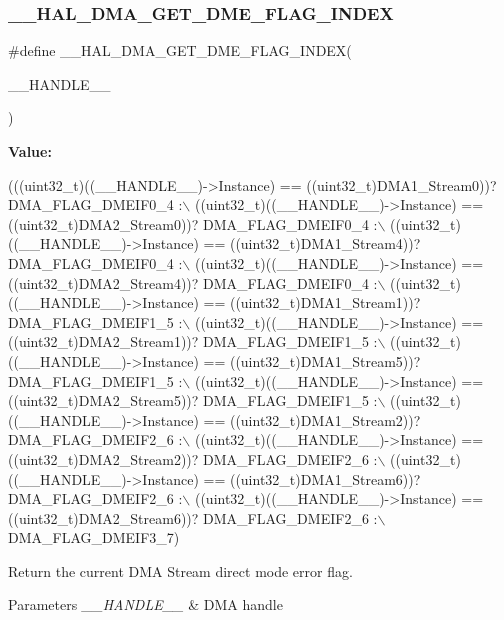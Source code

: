 \subsubsection{\texorpdfstring{\+\_\+\+\_\+\+H\+A\+L\+\_\+\+D\+M\+A\+\_\+\+G\+E\+T\+\_\+\+D\+M\+E\+\_\+\+F\+L\+A\+G\+\_\+\+I\+N\+D\+EX}{\_\_HAL\_DMA\_GET\_DME\_FLAG\_INDEX}}
{\footnotesize\ttfamily \#define \+\_\+\+\_\+\+H\+A\+L\+\_\+\+D\+M\+A\+\_\+\+G\+E\+T\+\_\+\+D\+M\+E\+\_\+\+F\+L\+A\+G\+\_\+\+I\+N\+D\+EX(\begin{DoxyParamCaption}\item[{}]{\+\_\+\+\_\+\+H\+A\+N\+D\+L\+E\+\_\+\+\_\+ }\end{DoxyParamCaption})}

{\bfseries Value\+:}
\begin{DoxyCode}
(((uint32\_t)((\_\_HANDLE\_\_)->Instance) == ((uint32\_t)DMA1\_Stream0))? DMA\_FLAG\_DMEIF0\_4 :\(\backslash\)
 ((uint32\_t)((\_\_HANDLE\_\_)->Instance) == ((uint32\_t)DMA2\_Stream0))? DMA\_FLAG\_DMEIF0\_4 :\(\backslash\)
 ((uint32\_t)((\_\_HANDLE\_\_)->Instance) == ((uint32\_t)DMA1\_Stream4))? DMA\_FLAG\_DMEIF0\_4 :\(\backslash\)
 ((uint32\_t)((\_\_HANDLE\_\_)->Instance) == ((uint32\_t)DMA2\_Stream4))? DMA\_FLAG\_DMEIF0\_4 :\(\backslash\)
 ((uint32\_t)((\_\_HANDLE\_\_)->Instance) == ((uint32\_t)DMA1\_Stream1))? DMA\_FLAG\_DMEIF1\_5 :\(\backslash\)
 ((uint32\_t)((\_\_HANDLE\_\_)->Instance) == ((uint32\_t)DMA2\_Stream1))? DMA\_FLAG\_DMEIF1\_5 :\(\backslash\)
 ((uint32\_t)((\_\_HANDLE\_\_)->Instance) == ((uint32\_t)DMA1\_Stream5))? DMA\_FLAG\_DMEIF1\_5 :\(\backslash\)
 ((uint32\_t)((\_\_HANDLE\_\_)->Instance) == ((uint32\_t)DMA2\_Stream5))? DMA\_FLAG\_DMEIF1\_5 :\(\backslash\)
 ((uint32\_t)((\_\_HANDLE\_\_)->Instance) == ((uint32\_t)DMA1\_Stream2))? DMA\_FLAG\_DMEIF2\_6 :\(\backslash\)
 ((uint32\_t)((\_\_HANDLE\_\_)->Instance) == ((uint32\_t)DMA2\_Stream2))? DMA\_FLAG\_DMEIF2\_6 :\(\backslash\)
 ((uint32\_t)((\_\_HANDLE\_\_)->Instance) == ((uint32\_t)DMA1\_Stream6))? DMA\_FLAG\_DMEIF2\_6 :\(\backslash\)
 ((uint32\_t)((\_\_HANDLE\_\_)->Instance) == ((uint32\_t)DMA2\_Stream6))? DMA\_FLAG\_DMEIF2\_6 :\(\backslash\)
   DMA\_FLAG\_DMEIF3\_7)
\end{DoxyCode}


Return the current D\+MA Stream direct mode error flag. 


\begin{DoxyParams}{Parameters}
{\em \+\_\+\+\_\+\+H\+A\+N\+D\+L\+E\+\_\+\+\_\+} & D\+MA handle \\
\hline
\end{DoxyParams}

